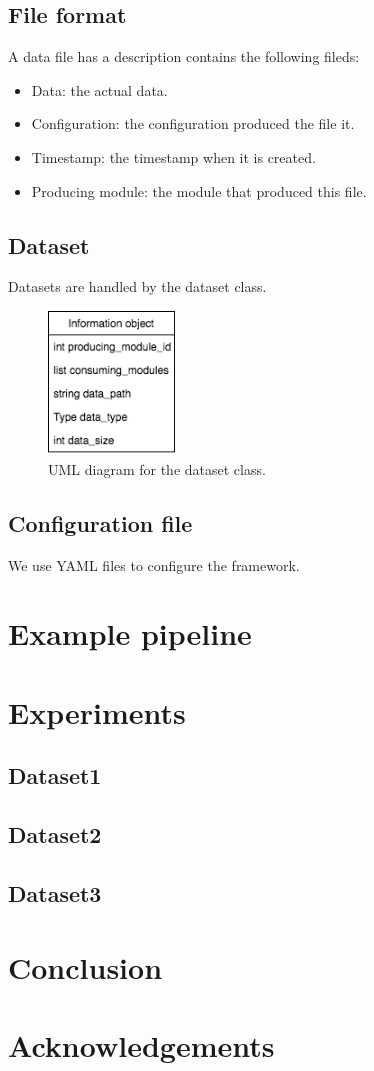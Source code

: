 \documentclass{article}
\begin{document}
    \subsection{File format}
    A data file has a description contains the following fileds:
    \begin{itemize}
        \item Data: the actual data.
        \item Configuration: the configuration produced the file it.
        \item Timestamp: the timestamp when it is created.
        \item Producing module: the module that produced this file.
    \end{itemize}


    \subsection{Dataset}
    Datasets are handled by the dataset class.

    \begin{figure}[H]
        \begin{center}
            \includegraphics[width=0.3\textwidth]{fig/dataset_uml.png}
        \end{center}
        \label{fig:dataset_uml}
        \caption{UML diagram for the dataset class.}
    \end{figure}

    \subsection{Configuration file}
    We use YAML files to configure the framework.


\section{Example pipeline}

\section{Experiments}
    \subsection{Dataset1}
    \subsection{Dataset2}
    \subsection{Dataset3}

\section{Conclusion}

\section*{Acknowledgements}
\end{document}

